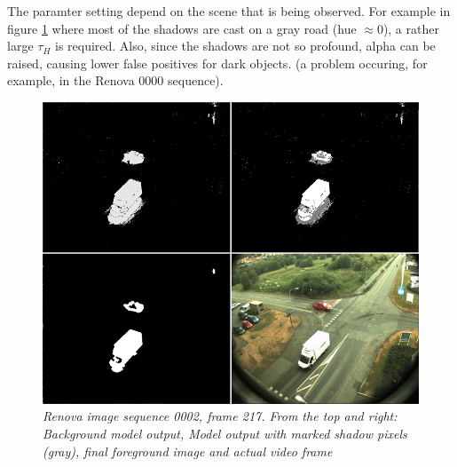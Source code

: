 The paramter setting depend on the scene that is being observed. For example in figure \ref{fig:shadow_suppression_fig} where most of the shadows are cast on a gray road (hue $\approx 0$), a rather large $\tau_H$ is required. Also, since the shadows are not so profound, alpha can be raised, causing lower false positives for dark objects. (a problem occuring, for example, in the Renova 0000 sequence).

\newpage
\begin{figure}[htb]
	\centering
	\includegraphics[width=\linewidth]{images/ShadowRenova0002.png}
	\caption{\textit{Renova image sequence 0002, frame 217. 
	From the top and right: Background model output, Model output with marked shadow pixels (gray), final foreground image and actual video frame}}
	\label{fig:shadow_suppression_fig}  %
\end{figure}
